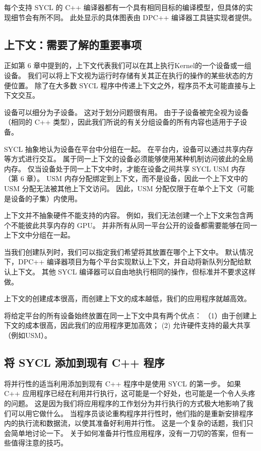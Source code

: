 每个支持 SYCL 的 C++ 编译器都有一个具有相同目标的编译模型，但具体的实现细节会有所不同。 
此处显示的具体图表由 DPC++ 编译器工具链实现者提供。

\subsection{上下文：需要了解的重要事项}
正如第 6 章中提到的，上下文代表我们可以在其上执行Kernel的一个设备或一组设备。 
我们可以将上下文视为运行时存储有关其正在执行的操作的某些状态的方便位置。 
除了在大多数 SYCL 程序中传递上下文之外，程序员不太可能直接与上下文交互。

设备可以细分为子设备。 这对于划分问题很有用。 
由于子设备被完全视为设备（相同的 C++ 类型），因此我们所说的有关分组设备的所有内容也适用于子设备。

SYCL 抽象地认为设备在平台中分组在一起。 在平台内，设备可以通过共享内存等方式进行交互。 
属于同一上下文的设备必须能够使用某种机制访问彼此的全局内存。 
仅当设备处于同一上下文中时，才能在设备之间共享 SYCL USM 内存（第 6 章）。 
USM 内存分配绑定到上下文，而不是设备，因此一个上下文中的 USM 分配无法被其他上下文访问。 
因此，USM 分配仅限于在单个上下文（可能是设备的子集）内使用。

上下文并不抽象硬件不能支持的内容。 
例如，我们无法创建一个上下文来包含两个不能彼此共享内存的 GPU。 
并非所有从同一平台公开的设备都需要能够在同一上下文中分组在一起。

当我们创建队列时，我们可以指定我们希望将其放置在哪个上下文中。 
默认情况下，DPC++ 编译器项目为每个平台实现默认上下文，并自动将新队列分配给默认上下文。 
其他 SYCL 编译器可以自由地执行相同的操作，但标准并不要求这样做。

\begin{remark}
	上下文的创建成本很高，而创建上下文的成本越低，我们的应用程序就越高效。
\end{remark}

将给定平台的所有设备始终放置在同一上下文中具有两个优点：
（1）由于创建上下文的成本很高，因此我们的应用程序更加高效； (2) 允许硬件支持的最大共享（例如USM）。

\subsection{将 SYCL 添加到现有 C++ 程序}
将并行性的适当利用添加到现有 C++ 程序中是使用 SYCL 的第一步。 
如果 C++ 应用程序已经在利用并行执行，这可能是一个好处，也可能是一个令人头疼的问题。 
这是因为我们将应用程序的工作划分为并行执行的方式极大地影响了我们可以用它做什么。 
当程序员谈论重构程序并行性时，他们指的是重新安排程序内的执行流和数据流，以使其准备好利用并行性。 
这是一个复杂的话题，我们只会简单地讨论一下。 
关于如何准备并行性应用程序，没有一刀切的答案，但有一些值得注意的技巧。

